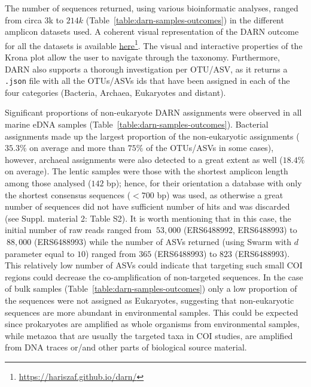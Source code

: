    The number of sequences returned, using various bioinformatic analyses, ranged from circa 3k to $214k$ (Table~\ref{table:darn-samples-outcomes}) in the different amplicon datasets used. 
   A coherent visual representation of the DARN outcome for all the datasets is 
   available \href{https://hariszaf.github.io/darn/}{here}\footnote{\href{https://hariszaf.github.io/darn/}{https://hariszaf.github.io/darn/}}. 
   The visual and interactive properties of the Krona plot allow the user to navigate through the taxonomy. 
   Furthermore, DARN also supports a thorough investigation per OTU/ASV, as it returns a \texttt{.json} file with 
   all the OTUs/ASVs ids that have been assigned in each of the four categories (Bacteria, Archaea, Eukaryotes and distant).
   
   Significant proportions of non-eukaryote DARN assignments were observed in all marine eDNA samples (Table~\ref{table:darn-samples-outcomes}). 
   Bacterial assignments made up the largest proportion of the non-eukaryotic assignments 
   ($35.3\%$ on average and more than $75\%$ of the OTUs/ASVs in some cases), however, archaeal assignments 
   were also detected to a great extent as well ($18.4\%$ on average). 
   The lentic samples were those with the shortest amplicon length among those analysed ($142$ bp); 
   hence, for their orientation a database with only the shortest consensus sequences ($<700$ bp) was used, as otherwise a great number of sequences did not have sufficient number of hits and was discarded (see Suppl. material 2: Table S2). 
   It is worth mentioning that in this case, the initial number of raw reads ranged 
   from $~53,000$ (ERS6488992, ERS6488993) to $~88,000$ (ERS6488993) while the number of ASVs returned 
   (using Swarm with $d$ parameter equal to $10$) ranged from $365$ (ERS6488993) to $823$ (ERS6488993). 
   This relatively low number of ASVs could indicate that targeting such small COI regions could decrease the 
   co-amplification of non-targeted sequences. 
   In the case of bulk samples (Table~\ref{table:darn-samples-outcomes}) only a low proportion of the sequences were not assigned as Eukaryotes, suggesting that non-eukaryotic sequences are more abundant in environmental samples. 
   This could be expected since prokaryotes are amplified as whole organisms from environmental samples, while metazoa that are usually the targeted taxa in COI studies, are amplified from DNA traces or/and other parts of biological source material.



